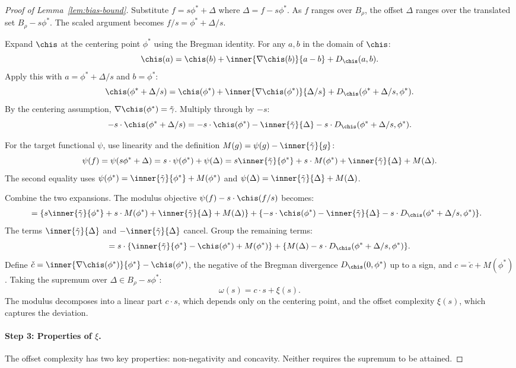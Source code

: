 \documentclass{article}
\begin{document}
\begin{proof}[Proof of Lemma~\ref{lem:bias-bound}]
Substitute $f = s\phi^* + \Delta$ where $\Delta = f - s\phi^*$. As $f$ ranges over $B_\rho$, the offset $\Delta$ ranges over the translated set $B_\rho - s\phi^*$. The scaled argument becomes $f/s = \phi^* + \Delta/s$.

Expand $\chis$ at the centering point $\phi^*$ using the Bregman identity. For any $a, b$ in the domain of $\chis$:
\[
\chis(a) = \chis(b) + \inner{\nabla\chis(b)}{a - b} + D_{\chis}(a, b).
\]
Apply this with $a = \phi^* + \Delta/s$ and $b = \phi^*$:
\[
\chis(\phi^* + \Delta/s) = \chis(\phi^*) + \inner{\nabla\chis(\phi^*)}{\Delta/s} + D_{\chis}(\phi^* + \Delta/s, \phi^*).
\]
By the centering assumption, $\nabla\chis(\phi^*) = \tilde\gamma$. Multiply through by $-s$:
\[
-s \cdot \chis(\phi^* + \Delta/s) = -s \cdot \chis(\phi^*) - \inner{\tilde\gamma}{\Delta} - s \cdot D_{\chis}(\phi^* + \Delta/s, \phi^*).
\]

For the target functional $\psi$, use linearity and the definition $M(g) = \psi(g) - \inner{\tilde\gamma}{g}$:
\[
\psi(f) = \psi(s\phi^* + \Delta) = s \cdot \psi(\phi^*) + \psi(\Delta) = s\inner{\tilde\gamma}{\phi^*} + s \cdot M(\phi^*) + \inner{\tilde\gamma}{\Delta} + M(\Delta).
\]
The second equality uses $\psi(\phi^*) = \inner{\tilde\gamma}{\phi^*} + M(\phi^*)$ and $\psi(\Delta) = \inner{\tilde\gamma}{\Delta} + M(\Delta)$.

Combine the two expansions. The modulus objective $\psi(f) - s \cdot \chis(f/s)$ becomes:
\begin{align*}
&= \qty{ s\inner{\tilde\gamma}{\phi^*} + s \cdot M(\phi^*) + \inner{\tilde\gamma}{\Delta} + M(\Delta) } + \qty{ -s \cdot \chis(\phi^*) - \inner{\tilde\gamma}{\Delta} - s \cdot D_{\chis}(\phi^* + \Delta/s, \phi^*) }.
\end{align*}
The terms $\inner{\tilde\gamma}{\Delta}$ and $-\inner{\tilde\gamma}{\Delta}$ cancel. Group the remaining terms:
\[
= s \cdot \qty{ \inner{\tilde\gamma}{\phi^*} - \chis(\phi^*) + M(\phi^*) } + \qty{ M(\Delta) - s \cdot D_{\chis}(\phi^* + \Delta/s, \phi^*) }.
\]
Define $\check{c} = \inner{\nabla\chis(\phi^*)}{\phi^*} - \chis(\phi^*)$, the negative of the Bregman divergence $D_{\chis}(0, \phi^*)$ up to a sign, and $c = \check{c} + M(\phi^*)$. Taking the supremum over $\Delta \in B_\rho - s\phi^*$:
\[
\omega(s) = c \cdot s + \xi(s).
\]
The modulus decomposes into a linear part $c \cdot s$, which depends only on the centering point, and the offset complexity $\xi(s)$, which captures the deviation.

\paragraph{Step 3: Properties of $\xi$.} The offset complexity has two key properties: non-negativity and concavity. Neither requires the supremum to be attained. %


\end{proof}
\end{document}
